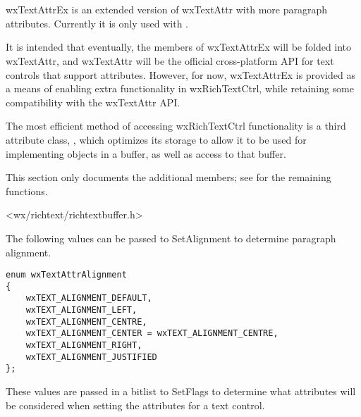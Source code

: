 \section{}\label{wxtextattrex}

wxTextAttrEx is an extended version of wxTextAttr with more paragraph attributes.
Currently it is only used with .

It is intended that eventually, the members of wxTextAttrEx will
be folded into wxTextAttr, and wxTextAttr will be the official
cross-platform API for text controls that support attributes.
However, for now, wxTextAttrEx is provided as a means of enabling
extra functionality in wxRichTextCtrl, while retaining some compatibility
with the wxTextAttr API.

The most efficient method of accessing wxRichTextCtrl functionality
is a third attribute class, , which
optimizes its storage to allow it to be used for implementing objects
in a buffer, as well as access to that buffer.

This section only documents the additional members; see  for
the remaining functions.




<wx/richtext/richtextbuffer.h>




The following values can be passed to SetAlignment to determine
paragraph alignment.

{\small
\begin{verbatim}
enum wxTextAttrAlignment
{
    wxTEXT_ALIGNMENT_DEFAULT,
    wxTEXT_ALIGNMENT_LEFT,
    wxTEXT_ALIGNMENT_CENTRE,
    wxTEXT_ALIGNMENT_CENTER = wxTEXT_ALIGNMENT_CENTRE,
    wxTEXT_ALIGNMENT_RIGHT,
    wxTEXT_ALIGNMENT_JUSTIFIED
};
\end{verbatim}
}

These values are passed in a bitlist to SetFlags to determine
what attributes will be considered when setting the attributes
for a text control.

